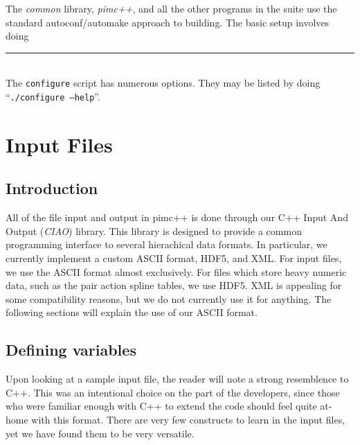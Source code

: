 \documentclass{book}
\begin{document}
The {\em common} library, {\em pimc++}, and all the other programs in
the suite use the standard autoconf/automake approach to building.
The basic setup involves doing\\
\rule{0.6cm}{0cm}\\
The \texttt{configure} script has numerous options.  They may be
listed by doing ``\texttt{./configure --help}''.

\chapter{Input Files}
\section{Introduction}
All of the file input and output in pimc++ is done through our 
C++ Input And Output ({\em CIAO}) library.  This library is designed
to provide a common programming interface to several hierachical data
formats.  In particular, we currently implement a custom ASCII format,
HDF5, and XML.  For input files, we use the ASCII format almost
exclusively.  For files which store heavy numeric data, such as the
pair action spline tables, we use HDF5.  XML is appealing for some
compatibility reasons, but we do not currently use it for anything.
The following sections will explain the use of our ASCII format.  

\section{Defining variables}
Upon looking at a sample input file, the reader will note a strong
resemblence to C++.  This was an intentional choice on the part of the
developers, since those who were familiar enough with C++ to extend
the code should feel quite at-home with this format.  There are very
few constructs to learn in the input files, yet we have found them to
be very versatile.  
\end{document}
